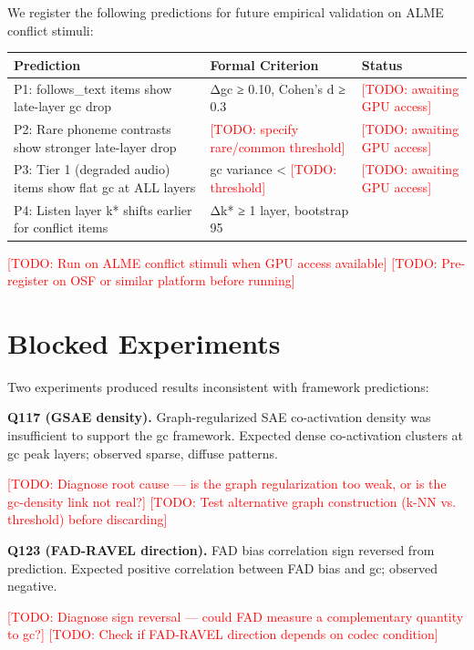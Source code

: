 \documentclass[a4paper]{article}
\begin{document}
{{We register the following predictions for future empirical validation on ALME conflict stimuli:

\begin{table}[htbp]
\centering
\begin{tabular}{lll}
\toprule
Prediction & Formal Criterion & Status \\
\midrule
P1: follows_text items show late-layer gc drop & Δgc ≥ 0.10, Cohen's d ≥ 0.3 & \textcolor{red}{[TODO: awaiting GPU access]} \\
P2: Rare phoneme contrasts show stronger late-layer drop & \textcolor{red}{[TODO: specify rare/common threshold]} & \textcolor{red}{[TODO: awaiting GPU access]} \\
P3: Tier 1 (degraded audio) items show flat gc at ALL layers & gc variance < \textcolor{red}{[TODO: threshold]} & \textcolor{red}{[TODO: awaiting GPU access]} \\
P4: Listen layer k* shifts earlier for conflict items & Δk* ≥ 1 layer, bootstrap 95%
\bottomrule
\end{tabular}
\end{table}

\textcolor{red}{[TODO: Run on ALME conflict stimuli when GPU access available]}
\textcolor{red}{[TODO: Pre-register on OSF or similar platform before running]}


\section{Blocked Experiments}

Two experiments produced results inconsistent with framework predictions:

\textbf{Q117 (GSAE density).} Graph-regularized SAE co-activation density was insufficient to support the gc framework. Expected dense co-activation clusters at gc peak layers; observed sparse, diffuse patterns.

\textcolor{red}{[TODO: Diagnose root cause — is the graph regularization too weak, or is the gc-density link not real?]}
\textcolor{red}{[TODO: Test alternative graph construction (k-NN vs. threshold) before discarding]}

\textbf{Q123 (FAD-RAVEL direction).} FAD bias correlation sign reversed from prediction. Expected positive correlation between FAD bias and gc; observed negative.

\textcolor{red}{[TODO: Diagnose sign reversal — could FAD measure a complementary quantity to gc?]}
\textcolor{red}{[TODO: Check if FAD-RAVEL direction depends on codec condition]}

}}
\end{document}
